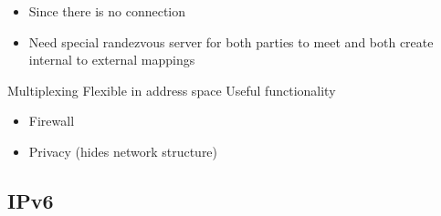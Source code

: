 \begin{itemize}
\begin{itemize}
            \item Since there is no connection
            \item Need special randezvous server for both parties to meet and both create internal to external mappings
        \end{itemize}
    \ipro Multiplexing
    \ipro Flexible in address space
    \ipro Useful functionality
        \begin{itemize}
            \item Firewall
            \item Privacy (hides network structure)
        \end{itemize}
\end{itemize}

\subsection{IPv6}
